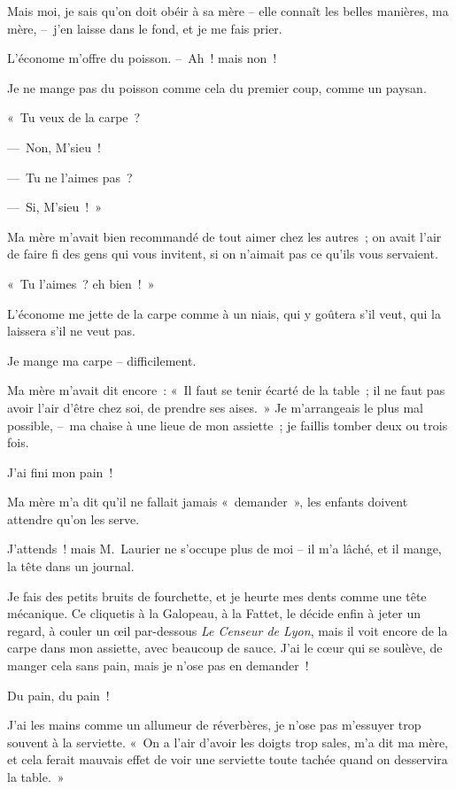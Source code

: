 \documentclass[french,twoside]{book} %
\begin{document}
Mais moi, je sais qu’on doit obéir à sa mère – elle connaît les belles manières, ma mère, – j’en laisse dans le fond, et je me fais prier.\par
L’économe m’offre du poisson. – Ah ! mais non !\par
Je ne mange pas du poisson comme cela du premier coup, comme un paysan.\par
« Tu veux de la carpe ?\par
— Non, M’sieu !\par
— Tu ne l’aimes pas ?\par
— Si, M’sieu ! »\par
Ma mère m’avait bien recommandé de tout aimer chez les autres ; on avait l’air de faire fi des gens qui vous invitent, si on n’aimait pas ce qu’ils vous servaient.\par
« Tu l’aimes ? eh bien ! »\par
L’économe me jette de la carpe comme à un niais, qui y goûtera s’il veut, qui la laissera s’il ne veut pas.\par
Je mange ma carpe – difficilement.\par
Ma mère m’avait dit encore : « Il faut se tenir écarté de la table ; il ne faut pas avoir l’air d’être chez soi, de prendre ses aises. » Je m’arrangeais le plus mal possible, – ma chaise à une lieue de mon assiette ; je faillis tomber deux ou trois fois.\par
\bigbreak
\noindent J’ai fini mon pain !\par
Ma mère m’a dit qu’il ne fallait jamais « demander », les enfants doivent attendre qu’on les serve.\par
J’attends ! mais M. Laurier ne s’occupe plus de moi – il m’a lâché, et il mange, la tête dans un journal.\par
Je fais des petits bruits de fourchette, et je heurte mes dents comme une tête mécanique. Ce cliquetis à la Galopeau, à la Fattet, le décide enfin à jeter un regard, à couler un œil par-dessous \emph{Le Censeur de Lyon}, mais il voit encore de la carpe dans mon assiette, avec beaucoup de sauce. J’ai le cœur qui se soulève, de manger cela sans pain, mais je n’ose pas en demander !\par
Du pain, du pain !\par
J’ai les mains comme un allumeur de réverbères, je n’ose pas m’essuyer trop souvent à la serviette. « On a l’air d’avoir les doigts trop sales, m’a dit ma mère, et cela ferait mauvais effet de voir une serviette toute tachée quand on desservira la table. »\par
\end{document}
